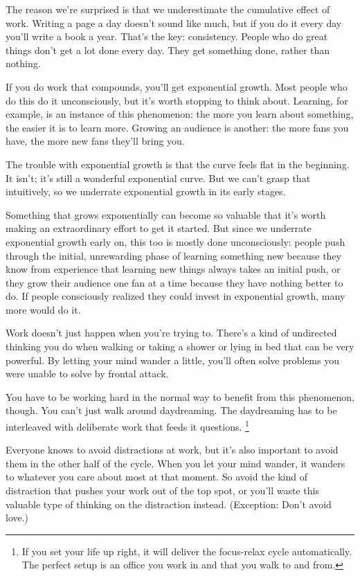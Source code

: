 The reason we're surprised is that we underestimate the cumulative
effect of work. Writing a page a day doesn't sound like much, but if you
do it every day you'll write a book a year. That's the key: consistency.
People who do great things don't get a lot done every day. They get
something done, rather than nothing.

If you do work that compounds, you'll get exponential growth. Most
people who do this do it unconsciously, but it's worth stopping to think
about. Learning, for example, is an instance of this phenomenon: the
more you learn about something, the easier it is to learn more. Growing
an audience is another: the more fans you have, the more new fans
they'll bring you.

The trouble with exponential growth is that the curve feels flat in the
beginning. It isn't; it's still a wonderful exponential curve. But we
can't grasp that intuitively, so we underrate exponential growth in its
early stages.

Something that grows exponentially can become so valuable that it's
worth making an extraordinary effort to get it started. But since we
underrate exponential growth early on, this too is mostly done
unconsciously: people push through the initial, unrewarding phase of
learning something new because they know from experience that learning
new things always takes an initial push, or they grow their audience one
fan at a time because they have nothing better to do. If people
consciously realized they could invest in exponential growth, many more
would do it.

Work doesn't just happen when you're trying to. There's a kind of
undirected thinking you do when walking or taking a shower or lying in
bed that can be very powerful. By letting your mind wander a little,
you'll often solve problems you were unable to solve by frontal attack.

You have to be working hard in the normal way to benefit from this
phenomenon, though. You can't just walk around daydreaming. The
daydreaming has to be interleaved with deliberate work that feeds it
questions. \footnote{If you set your life up right, it will deliver the focus-relax
cycle automatically. The perfect setup is an office you work in and that
you walk to and from.}

Everyone knows to avoid distractions at work, but it's also important to
avoid them in the other half of the cycle. When you let your mind
wander, it wanders to whatever you care about most at that moment. So
avoid the kind of distraction that pushes your work out of the top spot,
or you'll waste this valuable type of thinking on the distraction
instead. (Exception: Don't avoid love.)

